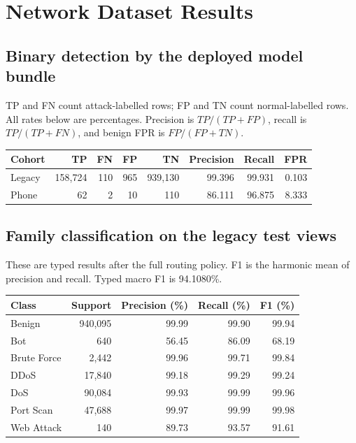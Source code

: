 \documentclass[11pt,a4paper]{article}
\newcommand{\chapterpage}[1]{\clearpage\section{#1}}
\begin{document}
\chapterpage{Network Dataset Results}
\subsection*{Binary detection by the deployed model bundle}
TP and FN count attack-labelled rows; FP and TN count normal-labelled rows.
All rates below are percentages. Precision is $TP/(TP+FP)$, recall is $TP/(TP+FN)$,
and benign FPR is $FP/(FP+TN)$.

\begin{center}\small
\begin{tabular}{@{}lrrrrrrr@{}}
\toprule Cohort & TP & FN & FP & TN & Precision & Recall & FPR\\\midrule
Legacy & 158,724 & 110 & 965 & 939,130 & 99.396 & 99.931 & 0.103 \\
Phone & 62 & 2 & 10 & 110 & 86.111 & 96.875 & 8.333 \\
\bottomrule
\end{tabular}
\end{center}

\subsection*{Family classification on the legacy test views}
These are typed results after the full routing policy. F1 is the harmonic mean of
precision and recall. Typed macro F1 is 94.1080\%.
\begin{center}\small
\begin{tabular}{@{}lrrrr@{}}
\toprule Class & Support & Precision (\%) & Recall (\%) & F1 (\%)\\\midrule
Benign & 940,095 & 99.99 & 99.90 & 99.94 \\
Bot & 640 & 56.45 & 86.09 & 68.19 \\
Brute Force & 2,442 & 99.96 & 99.71 & 99.84 \\
DDoS & 17,840 & 99.18 & 99.29 & 99.24 \\
DoS & 90,084 & 99.93 & 99.99 & 99.96 \\
Port Scan & 47,688 & 99.97 & 99.99 & 99.98 \\
Web Attack & 140 & 89.73 & 93.57 & 91.61 \\
\bottomrule
\end{tabular}
\end{center}
\end{document}
